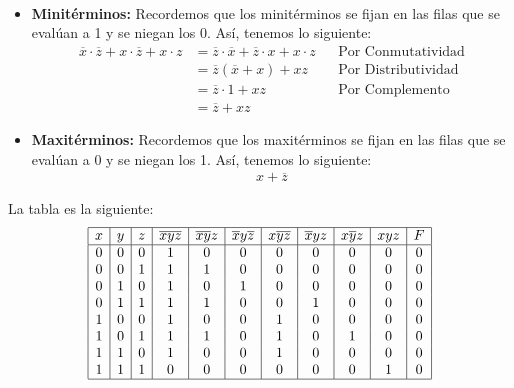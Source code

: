 \documentclass[answers]{exam}
\begin{document}
\begin{questions}
\begin{solution}
\begin{gather*}
    \end{gather*}
    \begin{itemize}
      \item \textbf{Minitérminos:} Recordemos que los minitérminos se fijan en
            las filas que se evalúan a 1 y se niegan los 0. Así, tenemos lo
            siguiente:
      \begin{align*}
        \overline{x} \cdot \overline{z} + x \cdot \overline{z} + x \cdot z
        &= \overline{z} \cdot \overline{x} + \overline{z} \cdot x + x \cdot z
        &&\text{Por Conmutatividad}\\
        &= \overline{z}(\overline{x} + x) + xz &&\text{Por Distributividad}\\
        &= \overline{z} \cdot 1 + xz &&\text{Por Complemento}\\
        &= \overline{z} + xz
      \end{align*}
      \item \textbf{Maxitérminos:} Recordemos que los maxitérminos se fijan en
            las filas que se evalúan a 0 y se niegan los 1. Así, tenemos lo
            siguiente:
      \begin{align*}
        x + \overline{z}
      \end{align*}
    \end{itemize}

  \end{solution}

   \vspace{-2em}
  \begin{solution}
    La tabla es la siguiente:
    \begin{gather*}
      \begin{array}{|c|c|c|c|c|c|c|c|c|c|c|}
        \hline
        x & y & z & \overline{xyz} & \overline{xy}z & \overline{x}y\overline{z} &
        x\overline{yz} & \overline{x}yz & x\overline{y}z & xyz & F \\
        \hline
        0 & 0 & 0 & 1 & 0 & 0 & 0 & 0 & 0 & 0 & 0 \\
        0 & 0 & 1 & 1 & 1 & 0 & 0 & 0 & 0 & 0 & 0 \\
        0 & 1 & 0 & 1 & 0 & 1 & 0 & 0 & 0 & 0 & 0 \\
        0 & 1 & 1 & 1 & 1 & 0 & 0 & 1 & 0 & 0 & 0 \\
        1 & 0 & 0 & 1 & 0 & 0 & 1 & 0 & 0 & 0 & 0 \\
        1 & 0 & 1 & 1 & 1 & 0 & 1 & 0 & 1 & 0 & 0 \\
        1 & 1 & 0 & 1 & 0 & 0 & 1 & 0 & 0 & 0 & 0 \\
        1 & 1 & 1 & 0 & 0 & 0 & 0 & 0 & 0 & 1 & 0 \\
        \hline
      \end{array}
    \end{gather*}
  \end{solution}


\end{questions}
\end{document}
